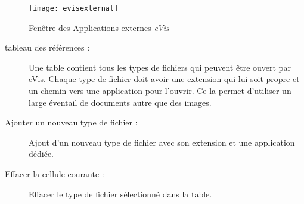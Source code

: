 \begin{figure}[htp]
   \begin{center}
\texttt{[image: evisexternal]}
\caption{\label{evisexternal}Fenêtre des Applications externes \emph{eVis} \nixcaption}
\end{center}
\end{figure}


\begin{description}
\item[tableau des références :] Une table contient tous les types de fichiers qui peuvent être ouvert par eVis. Chaque type de fichier doit avoir une extension qui lui soit propre et un chemin vers une application pour l'ouvrir. Ce la permet d'utiliser un large éventail de documents autre que des images.
\item[Ajouter un nouveau type de fichier :] Ajout d'un nouveau type de fichier avec son extension et une application dédiée.
\item[Effacer la cellule courante :] Effacer le type de fichier sélectionné dans la table.
\end{description}

\label{evis_specifying}

